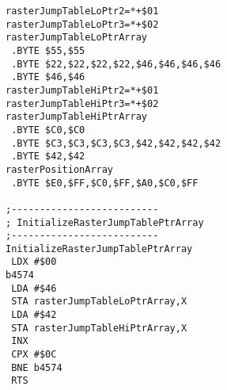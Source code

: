 \begin{minipage}[b]{0.33\linewidth}
\begin{lrbox}{\mybox}
\begin{lstlisting}[basicstyle=\ttfamily\tiny]
rasterJumpTableLoPtr2=*+$01
rasterJumpTableLoPtr3=*+$02
rasterJumpTableLoPtrArray 
 .BYTE $55,$55
 .BYTE $22,$22,$22,$22,$46,$46,$46,$46
 .BYTE $46,$46
rasterJumpTableHiPtr2=*+$01
rasterJumpTableHiPtr3=*+$02
rasterJumpTableHiPtrArray 
 .BYTE $C0,$C0
 .BYTE $C3,$C3,$C3,$C3,$42,$42,$42,$42
 .BYTE $42,$42
rasterPositionArray       
 .BYTE $E0,$FF,$C0,$FF,$A0,$C0,$FF

;--------------------------
; InitializeRasterJumpTablePtrArray
;--------------------------
InitializeRasterJumpTablePtrArray   
 LDX #$00
b4574
 LDA #$46
 STA rasterJumpTableLoPtrArray,X
 LDA #$42
 STA rasterJumpTableHiPtrArray,X
 INX 
 CPX #$0C
 BNE b4574
 RTS 

\end{lstlisting}
\end{lrbox}%
\scalebox{0.7}{\usebox{\mybox}}
\end{minipage}
\hspace{-0.8cm}
